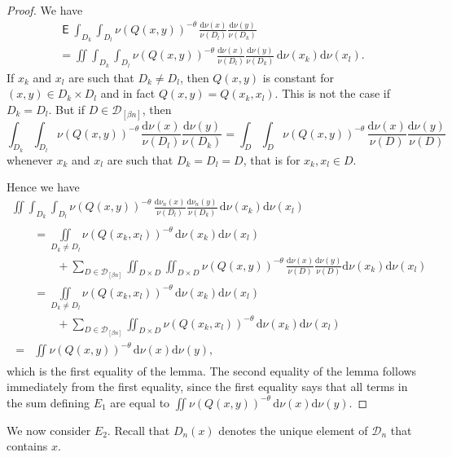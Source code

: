 \documentclass[10pt]{amsart}
\theoremstyle{definition}\newtheorem{defi}[theo]{Definition}\newtheorem{rema}[theo]{Remark}\newtheorem{exam}[theo]{Example}\newtheorem{exem}[theo]{Example}\newtheorem{nota}[theo]{Notation}
\DeclareMathOperator{\E}{\mathsf{E}}
\newcommand*{\dd}{\mathrm{d}}
\begin{document}
\begin{proof}
We have
\begin{multline*}
\E \int_{D_k} \int_{D_l} \nu (Q(x,y))^{-\theta} \,
\frac{\dd \nu (x)}{\nu (D_l)} \frac{\dd \nu (y)}{\nu (D_k)} \\ = \iint \int_{D_k} \int_{D_l} \nu (Q(x,y))^{-\theta} \, \frac{\dd \nu (x)}{\nu (D_l)}
\frac{\dd \nu (y)}{\nu (D_k)} \, \dd \nu (x_k)
\dd \nu (x_l).
\end{multline*}
If $x_k$ and $x_l$ are such that $D_k \neq D_l$, then $Q(x,y)$ is constant for $(x,y) \in D_k \times D_l$ and in fact $Q(x,y) = Q(x_k,x_l)$. This is not the case if $D_k = D_l$. But if $D \in
\mathscr{D}_{[\beta n]}$, then
\[
\int_{D_k} \int_{D_l} \nu (Q(x,y))^{-\theta} \, \frac{\dd
\nu (x)}{\nu (D_l)} \frac{\dd \nu (y)}{\nu (D_k)} =
\int_D \int_D \nu (Q(x,y))^{-\theta} \, \frac{\dd \nu (x)}{\nu (D)} \frac{\dd \nu (y)}{\nu (D)}
\]
whenever $x_k$ and $x_l$ are such that $D_k = D_l = D$, that is for $x_k, x_l \in D$.

Hence we have
\begin{multline*}
\iint \int_{D_k} \int_{D_l} \nu (Q(x,y))^{-\theta} \,
\frac{\dd \nu_n (x)}{\nu (D_l)} \frac{\dd \nu_n (y)}{\nu (D_k)} \, \dd \nu (x_k) \dd \nu (x_l)\\
\begin{aligned}
&= \iint\limits_{D_k \neq D_l} \nu (Q(x_k,x_l))^{-\theta} \, \dd\nu (x_k) \dd\nu (x_l) \\
&\qquad + \sum_{D \in
\mathscr{D}_{[\beta n]}} \iint_{D\times D} \iint_{D\times D} \nu (Q(x,y))^{-\theta} \, \frac{\dd \nu (x)}{\nu (D)} \frac{\dd \nu (y)}{\nu (D)} \dd \nu (x_k) \dd
\nu (x_l) \\
&= \iint\limits_{D_k \neq D_l} \nu (Q(x_k,x_l))^{-\theta} \, \dd\nu (x_k) \dd\nu (x_l)\\
&\qquad + \sum_{D \in \mathscr{D}_{[\beta n]}} \iint_{D\times D} \nu (Q(x_k,x_l))^{-\theta} \, \dd \nu (x_k) \dd \nu (x_l) \\ = & \iint \nu(Q(x,y))^{-\theta} \, \dd \nu (x)\dd \nu (y),
\end{aligned}
\end{multline*}
which is the first equality of the lemma. The second equality of the lemma follows immediately from the first equality, since the first equality says that all terms in the sum defining $E_1$ are equal to $\iint \nu(Q(x,y))^{-\theta} \, \dd \nu (x) \dd \nu (y)$.
\end{proof}

We now consider $E_2$. Recall that $D_n (x)$ denotes the unique element of $\mathscr{D}_n$ that contains $x$.
\end{document}
